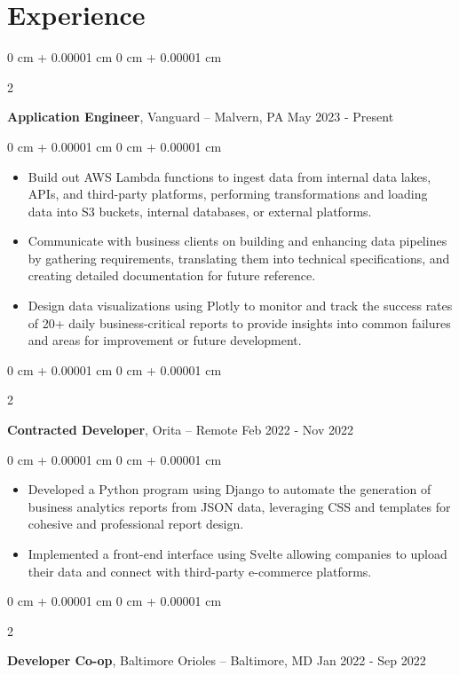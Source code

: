 \documentclass[10pt, letterpaper]{article}
\newenvironment{highlights}{
    \begin{itemize}[
        topsep=0.10 cm,
        parsep=0.10 cm,
        partopsep=0pt,
        itemsep=0pt,
        leftmargin=0 cm + 10pt
    ]
}{
    \end{itemize}
} %
\newenvironment{onecolentry}{
    \begin{adjustwidth}{
        0 cm + 0.00001 cm
    }{
        0 cm + 0.00001 cm
    }
}{
    \end{adjustwidth}
} %
\newenvironment{twocolentry}[2][]{
    \onecolentry
    \def\secondColumn{#2}
    \setcolumnwidth{\fill, 4.5 cm}
    \begin{paracol}{2}
}{
    \switchcolumn \raggedleft \secondColumn
    \end{paracol}
    \endonecolentry
} %
\begin{document}
    \section{Experience}
    \begin{twocolentry}{
        May 2023 - Present
    }
    \textbf{Application Engineer}, Vanguard -- Malvern, PA \end{twocolentry}
    \vspace{0.10 cm}
    \begin{onecolentry}
      \begin{highlights}
        \item Build out AWS Lambda functions to ingest data from internal data lakes, APIs, and third-party platforms, performing transformations and loading data into S3 buckets, internal databases, or external platforms.
        \item Communicate with business clients on building and enhancing data pipelines by gathering requirements, translating them into technical specifications, and creating detailed documentation for future reference.
        \item Design data visualizations using Plotly to monitor and track the success rates of 20+ daily business-critical reports to provide insights into common failures and areas for improvement or future development.
      \end{highlights}
    \end{onecolentry}
    \vspace{0.2 cm}
    \begin{twocolentry}{
        Feb 2022 - Nov 2022
    }
    \textbf{Contracted Developer}, Orita -- Remote \end{twocolentry}
    \vspace{0.10 cm}
    \begin{onecolentry}
      \begin{highlights}
        \item Developed a Python program using Django to automate the generation of business analytics reports from JSON data, leveraging CSS and templates for cohesive and professional report design.
        \item Implemented a front-end interface using Svelte allowing companies to upload their data and connect with third-party e-commerce platforms.
      \end{highlights}
    \end{onecolentry}
    \vspace{0.2 cm}
    \begin{twocolentry}{
        Jan 2022 - Sep 2022
    }
    \textbf{Developer Co-op}, Baltimore Orioles -- Baltimore, MD \end{twocolentry}
\end{document}
